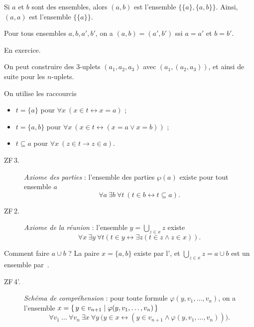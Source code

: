 \documentclass[./main]{subfiles}
\begin{document}
  \begin{defn}
    Si $a$ et $b$ sont des ensembles, alors $(a,b)$ est l'ensemble  $\{\{a\} , \{a,b\}\}$.
    Ainsi, $(a, a)$ est l'ensemble $\{\{a\} \} $.
  \end{defn}

  \begin{lem}
    Pour tous ensembles $a,b,a', b'$, on a  $(a,b) = (a', b')$ ssi  $a = a'$ et $b = b'$.
  \end{lem}
  \begin{prv}
    En exercice.
  \end{prv}

  \begin{defn}
    On peut construire des $3$-uplets $(a_1, a_2, a_3)$ avec $(a_1, (a_2, a_3))$, et ainsi de suite pour les $n$-uplets.
  \end{defn}

  \begin{nota}
    On utilise les raccourcis 
    \begin{itemize}
      \item $t = \{a\}$ pour $\forall x \: (x \in t \leftrightarrow x = a)$ ;
      \item $t = \{a,b\}$ pour $\forall x \: (x \in t \leftrightarrow (x = a \lor x = b))$ ;
      \item $t \subseteq a$ pour $\forall x \: (z \in t \to z \in a)$.
    \end{itemize}
  \end{nota}

  \begin{description}
    \item[ZF\,3.] \label{ZF3}
      \textit{Axiome des parties} : l'ensemble des parties $\wp(a)$ existe pour tout ensemble $a$
      \[
      \forall a \: \exists b \: \forall t \: (t \in b \leftrightarrow t \subseteq a)
      .\]
    \item[ZF\,2.] \label{ZF2} \textit{Axiome de la réunion} : l'ensemble $y = \bigcup_{z \in x} z$ existe 
      \[
      \forall x \: \exists y \: \forall t (t \in y \leftrightarrow\exists z (t \in z \land z \in x))
      .\]
  \end{description}

  \begin{rmk}
    Comment faire $a \cup b$ ?
    La paire $x = \{a,b\}$ existe par l'\pairaxiom, et $\bigcup_{z \in x} z = a \cup b$ est un ensemble par~.
  \end{rmk}

  \begin{description}
    \item[ZF\,4'.]
      \label{ZF4'}
      \textit{Schéma de compréhension} :
      pour toute formule $\varphi(y, v_1, \ldots, v_n)$, on a l'ensemble $x = \mleft\{\,y \in v_{n+1} \;\middle|\; \varphi(y, v_1, \ldots, v_n)\,\mright\}$
      \[
      \forall v_1\: \ldots\: \forall v_n \: \exists x \: \forall y \: \big(y \in x \leftrightarrow (y \in v_{n+1} \land \varphi(y, v_1, \ldots, v_n))\big)
      .\] 

  \end{description}
\end{document}
